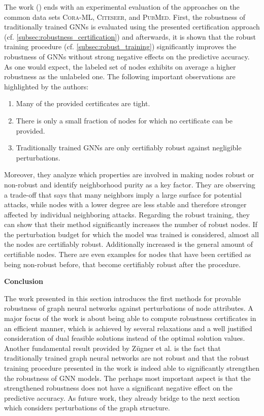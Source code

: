 \documentclass[a4paper,preprint]{sig-alternate}
\begin{document}
The work (\cite{Zuegner_2019}) ends with an experimental evaluation of the approaches on the common data sets \textsc{Cora-ML}, 
\textsc{Citeseer}, and \textsc{PubMed}. First, the robustness of traditionally trained GNNs is evaluated using the presented
certification approach (cf. \ref{subsec:robustness_certification}) and afterwards, it is shown that the robust training procedure
(cf. \ref{subsec:robust_training}) significantly improves the robustness of GNNs without strong negative effects on the predictive accuracy.
As one would expect, the labeled set of nodes exhibits on average a higher robustness as the unlabeled one.
The following important observations are highlighted by the authors:
\begin{enumerate}
    \item Many of the provided certificates are tight.
    \item There is only a small fraction of nodes for which no certificate can be provided.
    \item Traditionally trained GNNs are only certifiably robust against negligible perturbations.
\end{enumerate}
Moreover, they analyze which properties are involved in making nodes robust or non-robust and identify neighborhood purity
as a key factor. 
They are observing a trade-off that says that many neighbors imply a large surface for potential attacks, while nodes 
with a lower degree are less stable and therefore stronger affected by individual neighboring attacks.
Regarding the robust training, they can show that their method significantly increases the number of robust nodes. 
If the perturbation budget for which the model was trained is considered, almost all the nodes are certifiably robust. \cite{Zuegner_2019}
Additionally increased is the general amount of certifiable nodes. There are even examples for nodes that have been certified as being
non-robust before, that become certifiably robust after the procedure.\newline

\textbf{Conclusion}\newline

The work presented in this section introduces the first methods for provable robustness of graph neural networks against
perturbations of node attributes. A major focus of the work is about being able to compute robustness certificates in an efficient
manner, which is achieved by several relaxations and a well justified consideration of dual feasible solutions instead of the optimal
solution values. Another fundamental result provided by Zügner et al. \cite{Zuegner_2019} is the fact that traditionally trained graph neural
networks are not robust and that the robust training procedure presented in the work is indeed able to significantly strengthen the robustness
of GNN models. The perhaps most important aspect is that the strengthened robustness does not have a significant negative effect on the predictive accuracy.
As future work, they already bridge to the next section which considers perturbations of the graph structure.
\end{document}
